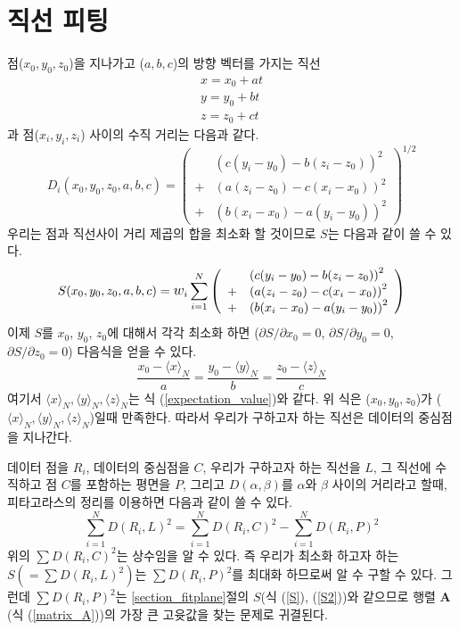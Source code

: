 \documentclass[chapter,a4paper,12pt]{oblivoir}
\begin{document}
\section{직선 피팅}
점($x_0, y_0, z_0$)을 지나가고 ($a,b,c$)의 방향 벡터를 가지는 직선
\begin{equation}
\left.
\begin{array}{ll}
x = x_0 + at \\\nonumber
y = y_0 + bt \\\nonumber
z = z_0 + ct
\end{array}\right.
\end{equation}
과 점($x_i, y_i, z_i$) 사이의 수직 거리는 다음과 같다.
\begin{equation}
D_i(x_0,y_0,z_0,a,b,c) = \left( 
\begin{array}{ll}
  &\left(c(y_i-y_0) - b(z_i - z_0)\right)^2 \\
  + &\left(a(z_i-z_0) - c(x_i - x_0)\right)^2 \\
  + &\left(b(x_i-x_0) - a(y_i - y_0)\right)^2 
\end{array} \right)^{1/2}
\end{equation}
우리는 점과 직선사이 거리 제곱의 합을 최소화 할 것이므로 $S$는 다음과 같이 쓸 수 있다.
\begin{equation}
S(x_0,y_0,z_0,a,b,c) = \mathlarger w_i \sum_{i=1}^N\left( 
\begin{array}{ll}
  &\left(c(y_i-y_0) - b(z_i - z_0)\right)^2 \\
  + &\left(a(z_i-z_0) - c(x_i - x_0)\right)^2 \\
  + &\left(b(x_i-x_0) - a(y_i - y_0)\right)^2 
\end{array} \right)
\end{equation}
이제 $S$를 $x_0$, $y_0$, $z_0$에 대해서 각각 최소화 하면
(${\partial S}/{\partial x_0}=0$, ${\partial S}/{\partial y_0}=0$, ${\partial S}/{\partial z_0}=0$)
다음식을 얻을 수 있다.
\begin{equation}
\frac{x_0-\langle x \rangle_N}{a} = \frac{y_0-\langle y \rangle_N}{b} = \frac{z_0-\langle z \rangle_N}{c}
\end{equation}
여기서 $\langle x \rangle_N , \langle y \rangle_N, \langle z \rangle_N$는 식 (\ref{expectation_value})와 같다.
위 식은 ($x_0,y_0,z_0$)가 ($\langle x \rangle_N,\langle y \rangle_N,\langle z \rangle_N$)일때 만족한다. 
따라서 우리가 구하고자 하는 직선은 데이터의 중심점을 지나간다.

데이터 점을 $R_i$, 데이터의 중심점을 $C$, 우리가 구하고자 하는 직선을 $L$, 
그 직선에 수직하고 점 $C$를 포함하는 평면을 $P$, 그리고 
$D(\alpha, \beta)$를 $\alpha$와 $\beta$ 사이의 거리라고 할때, 
피타고라스의 정리를 이용하면 다음과 같이 쓸 수 있다.
\begin{equation}
\sum_{i=1}^N D(R_i, L)^2 = \sum_{i=1}^N D(R_i, C)^2 - \sum_{i=1}^N D(R_i, P)^2
\end{equation}
위의 $\sum D(R_i, C)^2$는 상수임을 알 수 있다.
즉 우리가 최소화 하고자 하는 $S(=\sum D(R_i, L)^2)$는 
$\sum D(R_i, P)^2$를 최대화 하므로써 알 수 구할 수 있다.
그런데 $\sum D(R_i, P)^2$는 \ref{section_fitplane}절의 $S$(식 (\ref{S}), (\ref{S2}))와 같으므로
행렬 $\mathbf{A}$(식 (\ref{matrix_A}))의 가장 큰 고윳값을 찾는 문제로 귀결된다.
\end{document}
